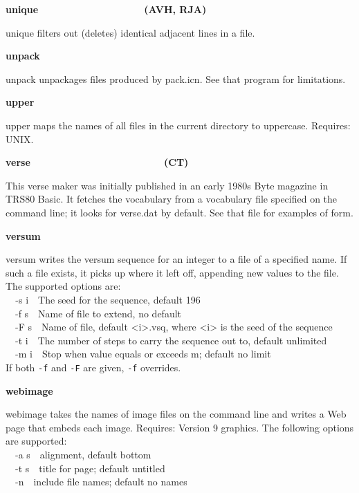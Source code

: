 {{\sffamily\bfseries
unique\ \ \ \ \ \ \ \ \ \ \ \ \ \ \ \ \ \  \ (AVH, RJA)}

\textsf{unique} filters out (deletes) identical adjacent lines in a
file. 

{\sffamily\bfseries
unpack\ \ \ \ \ \ \ \ \ \ \ \ \ \ \ \ \ \ \ \ }

\textsf{unpack} unpackages files produced by \textsf{pack.icn}. See that
program for limitations. 

{\sffamily\bfseries
upper\ \ \ \ \ \ \ \ \ \ \ \ \ \ \ \ \ \ \ \ \ \ }

\textsf{upper} maps the names of all files in the current directory to
uppercase. Requires: UNIX. 

{\sffamily\bfseries
verse\ \ \ \ \ \ \ \ \ \ \ \ \ \ \ \ \ \ \ \ \ \  \ \ (CT)}

This verse maker was initially published in an early 1980s
Byte magazine in TRS80 Basic. It fetches the vocabulary from a
vocabulary file specified on the command line; it looks for
\textsf{verse.dat} by default. See that file for examples of form. 

{\sffamily\bfseries
versum\ \ \ \ \ \ \ \ \ \ \ \ \ \ \ \ \ \ \ \ }

\textsf{versum} writes the versum sequence for an integer to a file of a
specified name. If such a file exists, it picks up where it left off,
appending new values to the file. The supported options are:\\
\texttt{\ \ }\textsf{{}-s i}\ \ The seed for the sequence, default
196\\
\ \ \textsf{{}-f s}\ \ Name of file to extend, no default\\
\ \ \textsf{{}-F s}\ \ Name of file, default
{\textless}i{\textgreater}.vsq, where {\textless}i{\textgreater} is the
seed of the sequence\\
\ \ \textsf{{}-t i}\ \ The number of steps to carry the sequence out to,
default unlimited\\
\ \ \textsf{{}-m i}\ \ Stop when value equals or exceeds m; default no
limit\\
If both \texttt{{}-f} and \texttt{{}-F} are given, \texttt{{}-f}
overrides.

{\sffamily\bfseries
webimage\ \ \ \ \ \ \ \ \ \ \ \ \ \ \ \ \ \ \ \ }

\textsf{webimage} takes the names of image files on the command line and
writes a Web page that embeds each image. Requires: Version 9 graphics.
The following options are supported:\\
\ \ \textsf{{}-a s}\ \ alignment, default
{\textquotedbl}bottom{\textquotedbl}\\
\ \ \textsf{{}-t s}\ \ title for page; default
{\textquotedbl}untitled{\textquotedbl}\\
\ \ \textsf{{}-n}\ \ include file names; default no names

}
